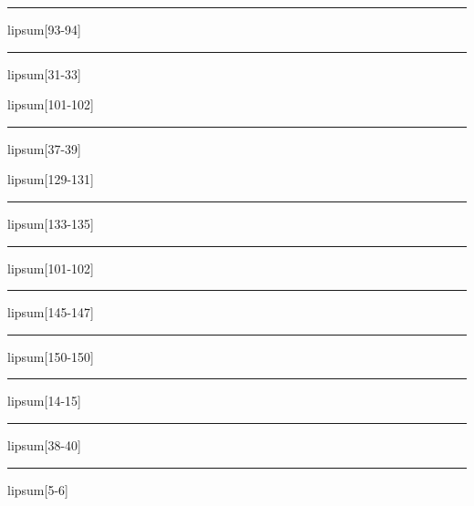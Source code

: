 \documentclass[11pt,a4paper]{article}
\begin{document}
\begin{simplewrap}
  \textcolor{pink!33}{\rule{3.1cm}{2.4cm}}
\end{simplewrap}
lipsum[93-94]

\begin{simplewrap}
  \textcolor{green!34}{\rule{4.5cm}{8.1cm}}
\end{simplewrap}
lipsum[31-33]

lipsum[101-102]

\begin{simplewrap}
  \textcolor{lime!60}{\rule{6.0cm}{6.5cm}}
\end{simplewrap}
lipsum[37-39]

lipsum[129-131]

\begin{simplewrap}
  \textcolor{blue!12}{\rule{3.1cm}{7.7cm}}
\end{simplewrap}
lipsum[133-135]

\begin{simplewrap}
  \textcolor{cyan!18}{\rule{4.0cm}{6.9cm}}
\end{simplewrap}
lipsum[101-102]

\begin{simplewrap}
  \textcolor{violet!47}{\rule{4.0cm}{8.6cm}}
\end{simplewrap}
lipsum[145-147]

\begin{simplewrap}
  \textcolor{red!33}{\rule{4.0cm}{2.9cm}}
\end{simplewrap}
lipsum[150-150]

\begin{simplewrap}
  \textcolor{red!48}{\rule{4.4cm}{9.7cm}}
\end{simplewrap}
lipsum[14-15]

\begin{simplewrap}
  \textcolor{cyan!43}{\rule{4.9cm}{7.0cm}}
\end{simplewrap}
lipsum[38-40]

\begin{simplewrap}
  \textcolor{magenta!12}{\rule{4.7cm}{7.6cm}}
\end{simplewrap}
lipsum[5-6]
\end{document}
